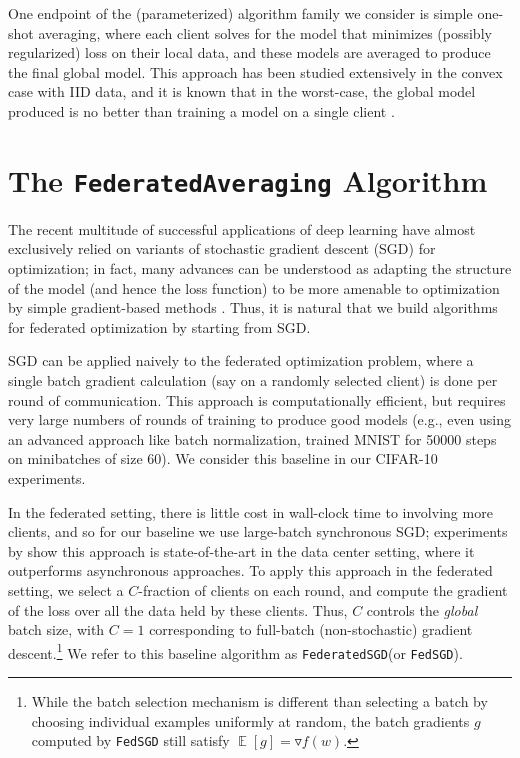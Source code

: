 \documentclass[twoside]{article}
\newcommand{\clientfrac}{\ensuremath{C}}    %
\newcommand{\algfont}[1]{\texttt{#1}}
\newcommand{\fedavglong}{\algfont{FederatedAveraging}\xspace}
\newcommand{\fedsgdlong}{\algfont{FederatedSGD}\xspace}
\newcommand{\fedsgd}{\algfont{FedSGD}\xspace}
\newcommand{\fedsgdshort}{\algfont{FedSGD}\xspace}
\DeclareMathOperator*{\E}{\mathbb{E}}
\newcommand{\grad}{\triangledown}
\begin{document}
One endpoint of the (parameterized) algorithm family we consider is
simple one-shot averaging, where each client solves for the model that
minimizes (possibly regularized) loss on their local data, and these
models are averaged to produce the final global model. This approach
has been studied extensively in the convex case with IID data, and it
is known that in the worst-case, the global model produced is no
better than training a model on a single client
\citep{zhang12communication,arjevani15commcomplexity,zinkevich10parallelized}.

\section{The \fedavglong Algorithm}
The recent multitude of successful applications of deep learning have
almost exclusively relied on variants of stochastic gradient descent
(SGD) for optimization; in fact, many advances can be understood as
adapting the structure of the model (and hence the loss function) to
be more amenable to optimization by simple gradient-based methods
\citep{goodfellow16deeplearning}. Thus, it is natural that we build
algorithms for federated optimization by starting from SGD.

SGD can be applied naively to the federated optimization problem,
where a single batch gradient calculation (say on a randomly selected
client) is done per round of communication. This approach is
computationally efficient, but requires very large numbers of rounds
of training to produce good models (e.g., even using an advanced
approach like batch normalization, \citet{ioffe16batchnorm} trained
MNIST for 50000 steps on minibatches of size 60). We consider this
baseline in our CIFAR-10 experiments.

In the federated setting, there is little cost in wall-clock time to
involving more clients, and so for our baseline we use large-batch
synchronous SGD; experiments by \citet{chen16revisiting} show this
approach is state-of-the-art in the data center setting, where it
outperforms asynchronous approaches.  To apply this approach in the
federated setting, we select a $\clientfrac$-fraction of clients on
each round, and compute the gradient of the loss over all the data
held by these clients. Thus, $\clientfrac$ controls the \emph{global}
batch size, with $\clientfrac=1$ corresponding to full-batch
(non-stochastic) gradient descent.\footnote{ While the batch selection
  mechanism is different than selecting a batch by choosing individual
  examples uniformly at random, the batch gradients $g$ computed by
  \fedsgd still satisfy $\E[g] = \grad f(w)$.}  We refer to this
baseline algorithm as \fedsgdlong (or \fedsgdshort).
\end{document}
